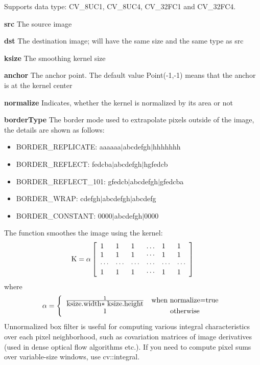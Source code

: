 \documentclass{article}
\begin{document}
Supports data type: CV{\_}8UC1, CV{\_}8UC4, CV{\_}32FC1 and CV{\_}32FC4.

\textbf{src }The source image

\textbf{dst }The destination image; will have the same size and the same
type as src

\textbf{ksize }The smoothing kernel size

\textbf{anchor }The anchor point. The default value Point(-1,-1) means that
the anchor is at the kernel center

\textbf{normalize }Indicates, whether the kernel is normalized by its area
or not

\textbf{borderType }The border mode used to extrapolate pixels outside of
the image, the details are shown as follows:

\begin{itemize}
\item BORDER{\_}REPLICATE: aaaaaa$\vert $abcdefgh$\vert $hhhhhhh
\item BORDER{\_}REFLECT: fedcba$\vert $abcdefgh$\vert $hgfedcb
\item BORDER{\_}REFLECT{\_}101: gfedcb$\vert $abcdefgh$\vert $gfedcba
\item BORDER{\_}WRAP: cdefgh$\vert $abcdefgh$\vert $abcdefg
\item BORDER{\_}CONSTANT: 0000$\vert $abcdefgh$\vert $0000
\end{itemize}

The function smoothes the image using the kernel:
\[
\mbox{K}=\alpha \left[ {{\begin{array}{*{20}c}
 1 \hfill & 1 \hfill & 1 \hfill & \ldots \hfill & 1 \hfill & 1 \hfill \\
 1 \hfill & 1 \hfill & 1 \hfill & \cdots \hfill & 1 \hfill & 1 \hfill \\
 \cdots \hfill & \cdots \hfill & \cdots \hfill & \cdots \hfill & \cdots
\hfill & \cdots \hfill \\
 1 \hfill & 1 \hfill & 1 \hfill & \cdots \hfill & 1 \hfill & 1 \hfill \\
\end{array} }} \right]
\]
where
\[
\alpha =\left\{ {{\begin{array}{*{20}c}
 {\frac{1}{\mbox{ksize.width$\ast$ ksize.height}}} & {\mbox{when
normalize=true}} \\
 1 & {\mbox{otherwise}} \\
\end{array} }} \right.
\]
Unnormalized box filter is useful for computing various integral
characteristics over each pixel neighborhood, such as covariation matrices
of image derivatives (used in dense optical flow algorithms etc.). If you
need to compute pixel sums over variable-size windows, use cv::integral.
\end{document}
